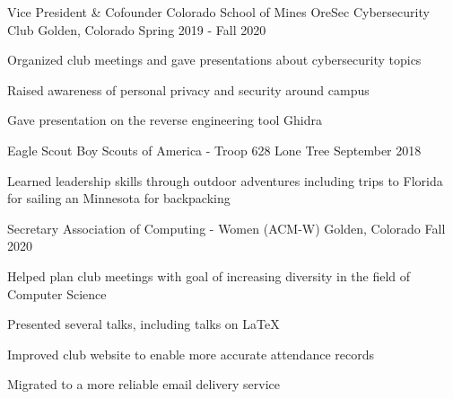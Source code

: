 \vspace{-2.0mm}

\begin{cventries}

  \cventry
    {Vice President \& Cofounder} %
    {Colorado School of Mines OreSec Cybersecurity Club} %
    {Golden, Colorado} %
    {Spring 2019 - Fall 2020} %
    {
      \begin{cvitems} %
        \item {Organized club meetings and gave presentations about
            cybersecurity topics}
        \item {Raised awareness of personal privacy and security around campus}
        \item {Gave presentation on the reverse engineering tool Ghidra}
      \end{cvitems}
    }

  \cventry
    {Eagle Scout} %
    {Boy Scouts of America - Troop 628} %
    {Lone Tree} %
    {September 2018} %
    {
      \begin{cvitems} %
        \item {Learned leadership skills through outdoor adventures
            including trips to Florida for sailing an Minnesota for
            backpacking}
      \end{cvitems}
    }

    \cventry
    {Secretary}
    {Association of Computing - Women (ACM-W)}
    {Golden, Colorado}
    {Fall 2020}
    {
      \begin{cvitems}
        \item {Helped plan club meetings with goal of increasing diversity in the field of Computer Science}
        \item {Presented several talks, including talks on \LaTeX } %
        \item {Improved club website to enable more accurate attendance records}
        \item {Migrated to a more reliable email delivery service}
      \end{cvitems}
    }


\end{cventries}

